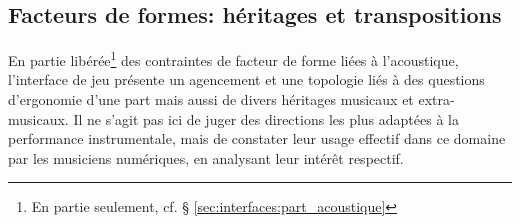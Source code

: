 
\subsection{Facteurs de formes: héritages et transpositions}
\label{sec:interfaces:heritages}

\noindent En partie libérée\footnote{En partie seulement, cf. § \ref{sec:interfaces:part_acoustique}} des contraintes de facteur de forme liées à l'acoustique, l'interface de jeu présente un agencement et une topologie liés à des questions d'ergonomie d'une part mais aussi de divers héritages musicaux et extra-musicaux. Il ne s'agit pas ici de juger des directions les plus adaptées à la performance instrumentale, mais de constater leur usage effectif dans ce domaine par les musiciens numériques, en analysant leur intérêt respectif.

